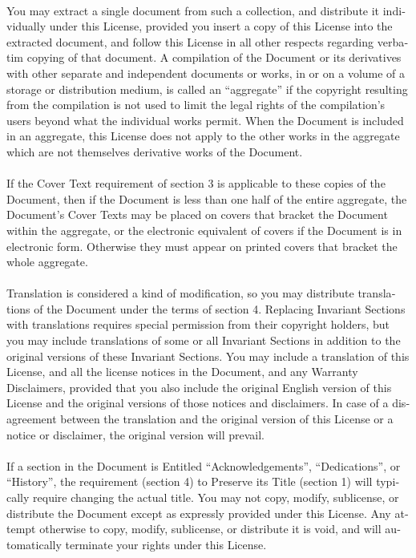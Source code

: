 \documentclass[11pt,a5paper,twoside]{book}
\begin{document}
\begin{english}
\paragraph{}You may extract a single document from such a collection, and
distribute it individually under this License, provided you insert a
copy of this License into the extracted document, and follow this
License in all other respects regarding verbatim copying of that
document.
A compilation of the Document or its derivatives with other separate
and independent documents or works, in or on a volume of a storage or
distribution medium, is called an “aggregate” if the copyright
resulting from the compilation is not used to limit the legal rights
of the compilation’s users beyond what the individual works permit.
When the Document is included in an aggregate, this License does not
apply to the other works in the aggregate which are not themselves
derivative works of the Document.
\paragraph{}If the Cover Text requirement of section 3 is applicable to these
copies of the Document, then if the Document is less than one half of
the entire aggregate, the Document’s Cover Texts may be placed on
covers that bracket the Document within the aggregate, or the
electronic equivalent of covers if the Document is in electronic form.
Otherwise they must appear on printed covers that bracket the whole
aggregate.
\paragraph{}Translation is considered a kind of modification, so you may
distribute translations of the Document under the terms of section 4.
Replacing Invariant Sections with translations requires special
permission from their copyright holders, but you may include
translations of some or all Invariant Sections in addition to the
original versions of these Invariant Sections.  You may include a
translation of this License, and all the license notices in the
Document, and any Warranty Disclaimers, provided that you also include
the original English version of this License and the original versions
of those notices and disclaimers.  In case of a disagreement between
the translation and the original version of this License or a notice
or disclaimer, the original version will prevail.
\paragraph{}If a section in the Document is Entitled “Acknowledgements”,
“Dedications”, or “History”, the requirement (section 4) to Preserve
its Title (section 1) will typically require changing the actual
title.
You may not copy, modify, sublicense, or distribute the Document
except as expressly provided under this License.  Any attempt
otherwise to copy, modify, sublicense, or distribute it is void, and
will automatically terminate your rights under this License.

\end{english}
\end{document}
